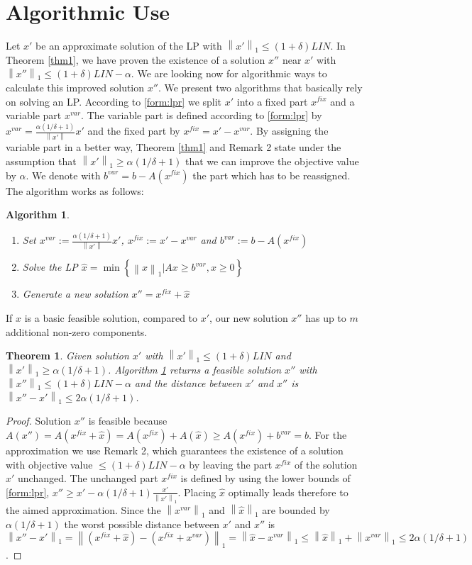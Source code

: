 \documentclass[a4paper,11pt]{article}
\newcommand{\mengest}[2]{\left\{#1|#2\right\}}
\newcommand{\nor}[1]{\left\|#1\right\|}
\newtheorem{thm}{Theorem}
\newtheorem{algo}{Algorithm}
\begin{document}
\section{Algorithmic Use}
Let $x'$ be an approximate solution of the LP with $\nor{x'}_1 \leq (1+ \delta) \mathit{LIN}$. 
In Theorem \ref{thm1}, we have proven the existence of a solution $x''$ near $x'$ with 
$\nor{x''}_1 \leq (1+ \delta) \mathit{LIN} - \alpha$.
We are looking now for algorithmic ways to calculate this improved solution $x''$.
We present two algorithms that basically rely on solving an LP.
According to \ref{form:lpr} 
we split $x'$ into a fixed part $x^{fix}$ and a variable part $x^{var}$.
The variable part is defined according to \ref{form:lpr} by $x^{var} =
\frac{\alpha(1 / \delta +1)}{\nor{x'}}x'$ and the fixed part by $x^{fix} = x' -
x^{var}$. By assigning the variable part in a better way, Theorem
\ref{thm1} and Remark 2 state under the assumption that $\nor{x'}_1 \geq \alpha(1/ \delta +1)$ that 
we can improve the objective value by $\alpha$. 
We denote with $b^{var} = b - A(x^{fix})$ the part which has to be reassigned. The
algorithm works as follows:
\begin{algo} \label{alg1}
\ 
  \begin{enumerate}
\item Set $x^{var} := \frac{\alpha(1 / \delta +1)}{\nor{x'}}x'$, $x^{fix} := x' - x^{var}$
  and $b^{var} := b - A(x^{fix})$
\item Solve the LP $\hat{x} = \min \mengest{\nor{x}_1}{Ax \geq b^{var}, x
    \geq 0 }$
\item Generate a new solution $x'' = x^{fix} + \hat{x}$
  \end{enumerate}
\end{algo}
If $\hat{x}$ is a basic feasible solution, compared to $x'$, our new solution $x''$ has up to $m$ additional
non-zero components.
\begin{thm}
	Given solution $x'$ with $\nor{x'}_1 \leq (1+\delta)\mathit{LIN}$ and $\nor{x'}_1 \geq \alpha(1/ \delta +1)$.
	Algorithm \ref{alg1} returns a feasible solution $x''$ with $\nor{x''}_1 \leq (1+\delta)\mathit{LIN} - \alpha$ and the 
	distance between $x'$ and $x''$ is $\nor{x''-x'}_1 \leq 2 \alpha(1/ \delta +1)$.
\end{thm}
\begin{proof}
Solution $x''$ is feasible because $A(x'') = A(x^{fix} + \hat{x}) = A(x^{fix}) + A(\hat{x}) \geq A(x^{fix}) + b^{var} = b$.
For the approximation we use Remark 2, which guarantees the existence of a solution 
with objective value 
$\leq (1+\delta)\mathit{LIN} - \alpha$ by leaving the part $x^{fix}$ of the solution $x'$ unchanged.
The unchanged part $x^{fix}$ is defined by using the lower bounds of \ref{form:lpr}, 
$x'' \geq x'- \alpha (1/ \delta +1) \frac{x'}{\nor{x'}_1}$. Placing
$\hat{x}$ optimally leads therefore to the aimed approximation. Since the $\nor{x^{var}}_1$ and $\nor{\hat{x}}_1$ are bounded by
$\alpha(1/ \delta +1)$ the worst possible distance between $x'$ and $x''$ is $\nor{x''-x'}_1 = 
\nor{(x^{fix} + \hat{x})- (x^{fix} + x^{var})}_1 = \nor{\hat{x}-x^{var}}_1 \leq \nor{\hat{x}}_1 + \nor{x^{var}}_1
\leq 2 \alpha(1/ \delta +1)$.
\end{proof}
\end{document}
